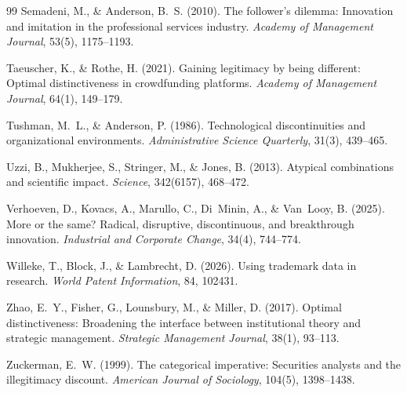 \begin{thebibliography}{99}
Semadeni, M., \& Anderson, B.~S. (2010). The follower's dilemma:
Innovation and imitation in the professional services industry.
\emph{Academy of Management Journal}, 53(5), 1175--1193.

Taeuscher, K., \& Rothe, H. (2021). Gaining legitimacy by being different:
Optimal distinctiveness in crowdfunding platforms. \emph{Academy of
Management Journal}, 64(1), 149--179.

Tushman, M.~L., \& Anderson, P. (1986). Technological discontinuities and
organizational environments. \emph{Administrative Science Quarterly},
31(3), 439--465.

Uzzi, B., Mukherjee, S., Stringer, M., \& Jones, B. (2013). Atypical
combinations and scientific impact. \emph{Science}, 342(6157), 468--472.

Verhoeven, D., Kovacs, A., Marullo, C., Di~Minin, A., \& Van~Looy, B.
(2025). More or the same? Radical, disruptive, discontinuous, and
breakthrough innovation. \emph{Industrial and Corporate Change}, 34(4),
744--774.

Willeke, T., Block, J., \& Lambrecht, D. (2026). Using trademark data in
research. \emph{World Patent Information}, 84, 102431.

Zhao, E.~Y., Fisher, G., Lounsbury, M., \& Miller, D. (2017). Optimal
distinctiveness: Broadening the interface between institutional theory and
strategic management. \emph{Strategic Management Journal}, 38(1), 93--113.

Zuckerman, E.~W. (1999). The categorical imperative: Securities analysts
and the illegitimacy discount. \emph{American Journal of Sociology},
104(5), 1398--1438.

\end{thebibliography}
